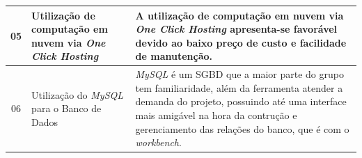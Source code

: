 \begin{apendicesenv}
\begin{table}[H]
\begin{adjustbox}{max width = 1\textwidth}
\begin{tabular}{|c|p{5cm}|p{10cm}|}
            \hline
            05 & Utilização de computação em nuvem via \textit{One Click Hosting}  & A utilização de computação em nuvem via \emph{One Click Hosting} apresenta-se favorável devido ao baixo preço de custo e facilidade de manutenção.\\
            \hline
            06 & Utilização do \textit{MySQL} para o Banco de Dados & \textit{MySQL} é um SGBD que a maior parte do grupo tem familiaridade, além da ferramenta atender a demanda do projeto, possuindo até uma interface mais amigável na hora da contrução e gerenciamento das relações do banco, que é com o \textit{workbench}. \\ 
            \hline
        \end{tabular}
    \end{adjustbox}
\end{table}


\end{apendicesenv}
